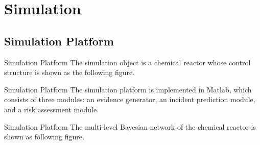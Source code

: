 \label{Section: Simulation}
\section{Simulation}
\subsection{Simulation Platform}
\begin{frame}{Simulation Platform}
    \label{Simulation: Control Structure of Chemical Reactor}
    The simulation object is a chemical reactor whose control structure is shown as the following figure.\\[-10pt]
    \begin{center}
      
    \end{center}
\end{frame}

\begin{frame}{Simulation Platform}
    \label{Simulation: Structure of Simulation Platform}
    The simulation platform is implemented in Matlab, which consists of three modules: an evidence generator, an incident prediction module, and a risk assessment module.
    \begin{center}
      
    \end{center}
\end{frame}

\begin{frame}{Simulation Platform}
    \label{Simulation: Multi-Level Bayesian Network of Reactor}
    The multi-level Bayesian network of the chemical reactor is shown as following figure.\vspace{-18pt}\\
    \begin{center}
      
    \end{center}
\end{frame}


